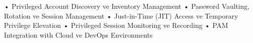 • Privileged Account Discovery ve Inventory Management
• Password Vaulting, Rotation ve Session Management
• Just-in-Time (JIT) Access ve Temporary Privilege Elevation
• Privileged Session Monitoring ve Recording
• PAM Integration with Cloud ve DevOps Environments